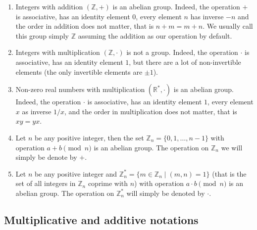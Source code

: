 \begin{examples}
\begin{enumerate}
\item Integers with addition $(\mathbb Z, +)$ is an abelian group.
Indeed, the operation $+$ is associative, has an identity element $0$, every element $n$ has inverse $-n$ and the order in addition does not matter, that is $n + m = m + n$.
We usually call this group simply $\mathbb Z$ assuming the addition as our operation by default.

\item Integers with multiplication $(\mathbb Z, \cdot)$ is not a group.
Indeed, the operation $\cdot$ is associative, has an identity element $1$, but there are a lot of non-invertible elements (the only invertible elements are $\pm1$).

\item Non-zero real numbers with multiplication $(\mathbb  R^*, \cdot)$ is an abelian group.
Indeed, the operation $\cdot$ is associative, has an identity element $1$, every element $x$ as inverse $1/x$, and the order in multiplication does not matter, that is $xy = yx$.

\item Let $n$ be any positive integer, then the set $\mathbb Z_n = \{0,1, \ldots, n-1\}$ with operation $a + b \pmod n$ is an abelian group.
The operation on $\mathbb Z_n$ we will simply be denote by $+$.

\item Let $n$ be any positive integer and $\mathbb Z_n^* = \{m\in \mathbb Z_n \mid (m,n) = 1\}$ (that is the set of all integers in $\mathbb Z_n$ coprime with $n$) with operation $a \cdot b \pmod n$ is an abelian group.
The operation on  $\mathbb Z_n^*$ will simply be denoted by $\cdot$.

\end{enumerate}
\end{examples}

\subsection{Multiplicative and additive notations}

